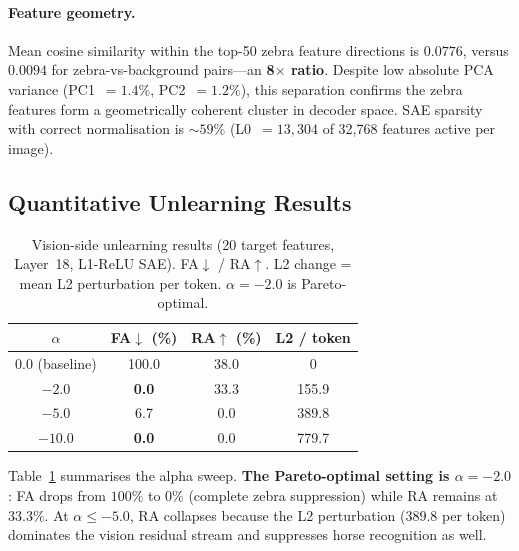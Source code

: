 \documentclass{article}
\begin{document}
\paragraph{Feature geometry.}
Mean cosine similarity within the top-50 zebra feature directions
is $0.0776$, versus $0.0094$ for zebra-vs-background pairs---an
\textbf{8$\times$ ratio}. Despite low absolute PCA variance
(PC1~$=1.4\%$, PC2~$=1.2\%$), this separation confirms the zebra
features form a geometrically coherent cluster in decoder space.
SAE sparsity with correct normalisation is $\sim\!59\%$
(L0~$=13{,}304$ of 32{,}768 features active per image).

\subsection{Quantitative Unlearning Results}

\begin{table}[ht]
\caption{Vision-side unlearning results (20 target features, Layer~18,
         L1-ReLU SAE). FA$\downarrow$ / RA$\uparrow$. L2 change =
         mean L2 perturbation per token. $\alpha=-2.0$ is Pareto-optimal.}
\label{tab:vision_results}
\vskip 0.15in
\begin{center}
\begin{small}
\begin{tabular}{cccc}
\toprule
\textbf{$\alpha$} & \textbf{FA$\downarrow$ (\%)}
  & \textbf{RA$\uparrow$ (\%)} & \textbf{L2 / token} \\
\midrule
$0.0$ (baseline)  & 100.0              & 38.0              & 0     \\
\rowcolor{bestgreen}
$-2.0$            & \textbf{0.0}  & 33.3 & 155.9 \\
$-5.0$            & 6.7  & \cellcolor{warnred}0.0  & 389.8 \\
$-10.0$           & \textbf{0.0}  & \cellcolor{warnred}0.0  & 779.7 \\
\bottomrule
\end{tabular}
\end{small}
\end{center}
\vskip -0.1in
\end{table}

Table~\ref{tab:vision_results} summarises the alpha sweep.
\textbf{The Pareto-optimal setting is $\alpha=-2.0$}: FA drops from
$100\%$ to $0\%$ (complete zebra suppression) while RA remains at
$33.3\%$. At $\alpha\leq-5.0$, RA collapses because the L2 perturbation
($389.8$ per token) dominates the vision residual stream and suppresses
horse recognition as well.
\end{document}
